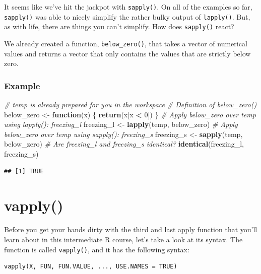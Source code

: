 \documentclass[
]{book}
\newenvironment{Shaded}{\begin{snugshade}}{\end{snugshade}}
\newcommand{\CommentTok}[1]{\textcolor[rgb]{0.56,0.35,0.01}{\textit{#1}}}
\newcommand{\ControlFlowTok}[1]{\textcolor[rgb]{0.13,0.29,0.53}{\textbf{#1}}}
\newcommand{\DecValTok}[1]{\textcolor[rgb]{0.00,0.00,0.81}{#1}}
\newcommand{\KeywordTok}[1]{\textcolor[rgb]{0.13,0.29,0.53}{\textbf{#1}}}
\newcommand{\NormalTok}[1]{#1}
\newcommand{\OperatorTok}[1]{\textcolor[rgb]{0.81,0.36,0.00}{\textbf{#1}}}
\newcommand{\StringTok}[1]{\textcolor[rgb]{0.31,0.60,0.02}{#1}}
\begin{document}
It seems like we've hit the jackpot with \texttt{sapply()}. On all of the examples so far, \texttt{sapply()} was able to nicely simplify the rather bulky output of \texttt{lapply()}. But, as with life, there are things you can't simplify. How does \texttt{sapply()} react?

We already created a function, \texttt{below\_zero()}, that takes a vector of numerical values and returns a vector that only contains the values that are strictly below zero.

\hypertarget{example-5}{%
\subsubsection{Example}\label{example-5}}

\begin{Shaded}
\begin{Highlighting}[]
\CommentTok{# temp is already prepared for you in the workspace}
\CommentTok{# Definition of below_zero()}
\NormalTok{below_zero <-}\StringTok{ }\ControlFlowTok{function}\NormalTok{(x) \{}
  \KeywordTok{return}\NormalTok{(x[x }\OperatorTok{<}\StringTok{ }\DecValTok{0}\NormalTok{])}
\NormalTok{\}}
\CommentTok{# Apply below_zero over temp using lapply(): freezing_l}
\NormalTok{freezing_l <-}\StringTok{ }\KeywordTok{lapply}\NormalTok{(temp, below_zero)}
\CommentTok{# Apply below_zero over temp using sapply(): freezing_s}
\NormalTok{freezing_s <-}\StringTok{ }\KeywordTok{sapply}\NormalTok{(temp, below_zero)}
\CommentTok{# Are freezing_l and freezing_s identical?}
\KeywordTok{identical}\NormalTok{(freezing_l, freezing_s)}
\end{Highlighting}
\end{Shaded}

\begin{verbatim}
## [1] TRUE
\end{verbatim}

\hypertarget{vapply}{%
\section{vapply()}\label{vapply}}

Before you get your hands dirty with the third and last apply function that you'll learn about in this intermediate R course, let's take a look at its syntax. The function is called \texttt{vapply()}, and it has the following syntax:

\begin{verbatim}
vapply(X, FUN, FUN.VALUE, ..., USE.NAMES = TRUE)
\end{verbatim}
\end{document}
